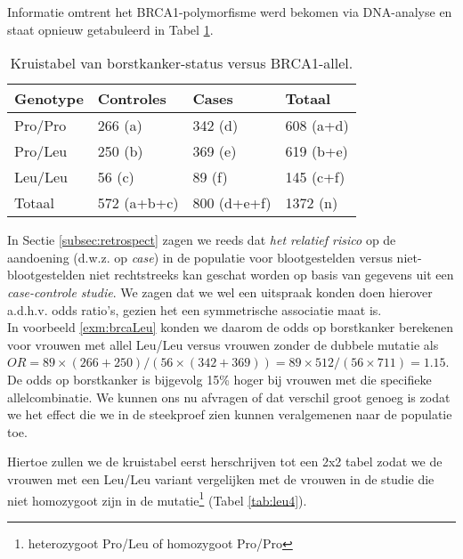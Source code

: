 \documentclass[12pt,dutch,coursenotes]{book}
\newenvironment{Shaded}{\begin{snugshade}}{\end{snugshade}}
\newcommand{\KeywordTok}[1]{\textcolor[rgb]{0.13,0.29,0.53}{\textbf{#1}}}
\newcommand{\StringTok}[1]{\textcolor[rgb]{0.31,0.60,0.02}{#1}}
\newcommand{\OperatorTok}[1]{\textcolor[rgb]{0.81,0.36,0.00}{\textbf{#1}}}
\newcommand{\NormalTok}[1]{#1}
\let\rmarkdownfootnote\footnote%
\def\footnote{\protect\rmarkdownfootnote}
\theoremstyle{definition}
\theoremstyle{definition}
\theoremstyle{definition}
\theoremstyle{remark}
\begin{document}
Informatie omtrent het BRCA1-polymorfisme werd bekomen via DNA-analyse
en staat opnieuw getabuleerd in Tabel \ref{tab:leu3}.

\begin{table}

\caption{\label{tab:leu3}Kruistabel van borstkanker-status versus BRCA1-allel.}
\centering
\begin{tabular}[t]{llll}
\toprule
Genotype & Controles & Cases & Totaal\\
\midrule
Pro/Pro & 266 (a) & 342 (d) & 608 (a+d)\\
Pro/Leu & 250 (b) & 369 (e) & 619 (b+e)\\
Leu/Leu & 56 (c) & 89 (f) & 145 (c+f)\\
Totaal & 572 (a+b+c) & 800 (d+e+f) & 1372 (n)\\
\bottomrule
\end{tabular}
\end{table}

In Sectie \ref{subsec:retrospect} zagen we reeds dat \emph{het relatief
risico} op de aandoening (d.w.z. op \emph{case}) in de populatie voor
blootgestelden versus niet-blootgestelden niet rechtstreeks kan geschat
worden op basis van gegevens uit een \emph{case-controle studie}. We
zagen dat we wel een uitspraak konden doen hierover a.d.h.v. odds
ratio's, gezien het een symmetrische associatie maat is.\\
In voorbeeld \ref{exm:brcaLeu} konden we daarom de odds op borstkanker
berekenen voor vrouwen met allel Leu/Leu versus vrouwen zonder de
dubbele mutatie als
\(OR=89\times (266+250)/(56\times (342+369))=89\times 512/(56 \times 711)=1.15\).
De odds op borstkanker is bijgevolg 15\% hoger bij vrouwen met die
specifieke allelcombinatie. We kunnen ons nu afvragen of dat verschil
groot genoeg is zodat we het effect die we in de steekproef zien kunnen
veralgemenen naar de populatie toe.

Hiertoe zullen we de kruistabel eerst herschrijven tot een 2x2 tabel
zodat we de vrouwen met een Leu/Leu variant vergelijken met de vrouwen
in de studie die niet homozygoot zijn in de mutatie\footnote{heterozygoot
  Pro/Leu of homozygoot Pro/Pro} (Tabel \ref{tab:leu4}).

\begin{Shaded}
\end{Shaded}
\end{document}

